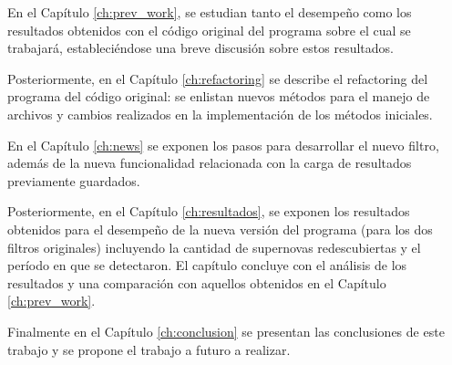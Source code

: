 
En el Cap\'itulo \ref{ch:prev_work}, se estudian tanto el desempe\~no como los resultados obtenidos con el c\'odigo original del programa sobre el cual se trabajar\'a, estableci\'endose una breve discusi\'on sobre estos resultados. 
\bigskip

Posteriormente, en el Cap\'itulo \ref{ch:refactoring} se describe el refactoring del programa  del c\'odigo original: se enlistan nuevos m\'etodos para el manejo de archivos y cambios realizados en la implementaci\'on de los m\'etodos iniciales. 
\bigskip

En el Cap\'itulo \ref{ch:news} se exponen los pasos para desarrollar el nuevo filtro, adem\'as de la nueva funcionalidad relacionada con la carga de resultados previamente guardados.
\bigskip

Posteriormente, en el Cap\'itulo \ref{ch:resultados}, se exponen los resultados obtenidos para el desempe\~no de la nueva versi\'on del programa (para los dos filtros originales) incluyendo la cantidad de supernovas redescubiertas y el per\'iodo en que se detectaron. El cap\'itulo concluye con el an\'alisis de los resultados y una comparaci\'on con aquellos obtenidos en el Cap\'itulo \ref{ch:prev_work}.
\bigskip

Finalmente en el Cap\'itulo \ref{ch:conclusion} se presentan las conclusiones de este trabajo y se propone el trabajo a futuro a realizar.


